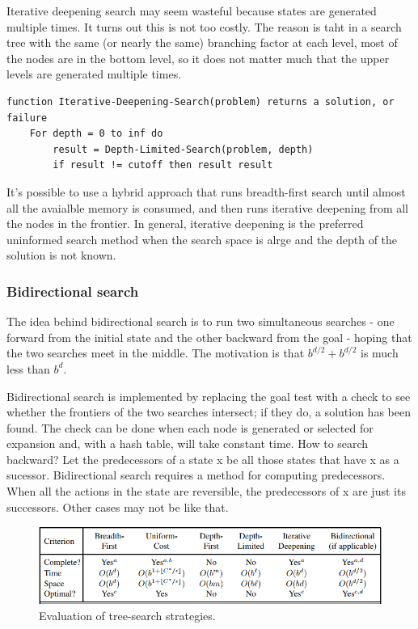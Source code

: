 \documentclass{article}
\begin{document}
Iterative deepening search may seem wasteful because states are generated multiple times. It turns out this is not too costly. The reason is taht in a search tree with the same (or nearly the same) branching factor at each level, most of the nodes are in the bottom level, so it does not matter much that the upper levels are generated multiple times.

\begin{lstlisting}
function Iterative-Deepening-Search(problem) returns a solution, or failure
    For depth = 0 to inf do 
        result = Depth-Limited-Search(problem, depth)
        if result != cutoff then result result
\end{lstlisting}

It's possible to use a hybrid approach that runs breadth-first search until almost all the avaialble memory is consumed, and then runs iterative deepening from all the nodes in the frontier. In general, iterative deepening is the preferred uninformed search method when the search space is alrge and the depth of the solution is not known. 

\subsubsection{Bidirectional search}

The idea behind bidirectional search is to run two simultaneous searches - one forward from the initial state and the other backward from the goal - hoping that the two searches meet in the middle. The motivation is that $ b^{d/2} + b^{d/2} $ is much less than $ b^d $.

Bidirectional search is implemented by replacing the goal test with a check to see whether the frontiers of the two searches intersect; if they do, a solution has been found. The check can be done when each node is generated or selected for expansion and, with a hash table, will take constant time. How to search backward? Let the predecessors of a state x be all those states that have x as a sucessor. Bidirectional search requires a method for computing predecessors. When all the actions in the state are reversible, the predecessors of x are just its successors. Other cases may not be like that. 

\begin{figure}
     \center
     \includegraphics[scale = 0.8]{search_comparison.png}
     \caption{Evaluation of tree-search strategies.}
     \label{fig:search_comparison}
\end{figure}
\end{document}
